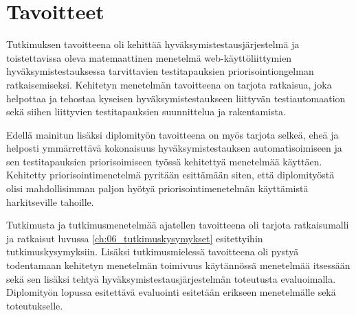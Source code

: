 \section{Tavoitteet} \label{ch:06_tavoitteet}

  Tutkimuksen tavoitteena oli kehittää hyväksymistestausjärjestelmä ja toistettavissa oleva matemaattinen menetelmä web-käyttöliittymien hyväksymistestauksessa tarvittavien testitapauksien priorisointiongelman ratkaisemiseksi.
  Kehitetyn menetelmän tavoitteena on tarjota ratkaisua, joka helpottaa ja tehostaa kyseisen hyväksymistestaukseen liittyvän testiautomaation sekä siihen liittyvien testitapauksien suunnittelua ja rakentamista.

  Edellä mainitun lisäksi diplomityön tavoitteena on myös tarjota selkeä, eheä ja helposti ymmärrettävä kokonaisuus hyväksymistestauksen automatisoimiseen ja sen testitapauksien priorisoimiseen työssä kehitettyä menetelmää käyttäen.
  Kehitetty priorisointimenetelmä pyritään esittämään siten, että diplomityöstä olisi mahdollisimman paljon hyötyä priorisointimenetelmän käyttämistä harkitseville tahoille.

  Tutkimusta ja tutkimusmenetelmää ajatellen tavoitteena oli tarjota ratkaisumalli ja ratkaisut luvussa \ref{ch:06_tutkimuskysymykset} esitettyihin tutkimuskysymyksiin.
  Lisäksi tutkimusmielessä tavoitteena oli pystyä todentamaan kehitetyn menetelmän toimivuus käytännössä menetelmää itsessään sekä sen lisäksi tehtyä hyväksymistestausjärjestelmän toteutusta evaluoimalla.
  Diplomityön lopussa esitettävä evaluointi esitetään erikseen menetelmälle sekä toteutukselle.
